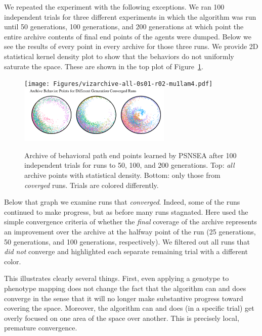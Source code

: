 \documentclass[twoside]{article}
\begin{document}
We repeated the experiment with the following exceptions. We ran 100 independent trials for three different experiments in which the algorithm was run until 50 generations, 100 generations, and 200 generations at which point the entire archive contents of final end points of the agents were dumped.  Below we see the results of every point in every archive for those three runs.  We provide 2D statistical kernel density plot to show that the behaviors do not uniformly saturate the space.  These are shown in the top plot of Figure~\ref{fig:vizarchive:all}.
%
\begin{figure}[ht]
  \begin{center}
    \texttt{[image: Figures/vizarchive-all-0s01-r02-mu1lam4.pdf]}\\
    \includegraphics[width=0.65\textwidth]{Figures/vizarchive-conv-s01-r02-mu1lam4.pdf}
  \end{center}
  \vspace*{-1em}
  \caption{\label{fig:vizarchive:all} Archive of behavioral path end points learned by PSNSEA after 100 independent trials for  runs to 50, 100, and 200 generations.  Top: \emph{all} archive points with statistical density.  Bottom: only those from \emph{coverged} runs.  Trials are colored differently.}
\end{figure}

Below that graph we examine runs that \emph{converged}.  Indeed, some of the runs continued to make progress, but as before many runs stagnated.  Here used the simple convergence criteria of whether the \emph{final} coverage of the archive represents an improvement over the archive at the halfway point of the run (25 generations, 50 generations, and 100 generations, respectively).  We filtered out all runs that \emph{did not} converge and highlighted each separate remaining trial with a different color.

This illustrates clearly several things.  First, even applying a genotype to phenotype mapping does not change the fact that the algorithm can and does converge in the sense that it will no longer make substantive progress toward covering the space.  Moreover, the algorithm can and does (in a specific trial) get overly focused on one area of the space over another.  This is precisely local, premature convergence.
\end{document}
